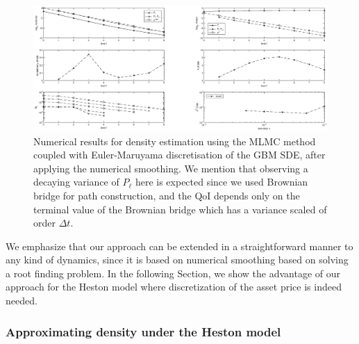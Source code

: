 	\begin{figure}[h!]
\centering
\includegraphics[width=1.2\linewidth]{./figures/MLMC_density_GBM_estimation/density_L0_2_L_8.eps}

\caption{Numerical results for  density estimation  using the MLMC method coupled with Euler-Maruyama discretisation of the GBM SDE, after applying  the numerical smoothing. We mention that observing a decaying variance of $P_{\ell}$ here is expected since we used Brownian bridge for path construction, and the QoI depends only on the terminal value of the Brownian bridge which has a variance scaled of order $\Delta t$.}
\label{fig:euler_density_MLMC_with_smoothing}
\end{figure}
\FloatBarrier
We emphasize that our approach can be extended in a straightforward manner to any kind of dynamics, since it is based on numerical smoothing based on solving a root finding problem.  In the following Section, we show the advantage of our approach for the Heston model where discretization of the asset price is indeed needed.

\subsubsection{Approximating density under the Heston model}\label{sec:Approximating density under the Heston model}

